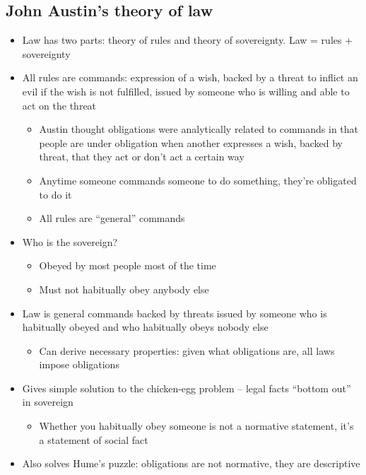 \hypertarget{john-austins-theory-of-law}{%
\subsection{John Austin's theory of
law}\label{john-austins-theory-of-law}}

\begin{itemize}
\tightlist
\item
  Law has two parts: theory of rules and theory of sovereignty. Law =
  rules + sovereignty
\item
  All rules are commands: expression of a wish, backed by a threat to
  inflict an evil if the wish is not fulfilled, issued by someone who is
  willing and able to act on the threat

  \begin{itemize}
  \tightlist
  \item
    Austin thought obligations were analytically related to commands in
    that people are under obligation when another expresses a wish,
    backed by threat, that they act or don't act a certain way
  \item
    Anytime someone commands someone to do something, they're obligated
    to do it
  \item
    All rules are ``general'' commands
  \end{itemize}
\item
  Who is the sovereign?

  \begin{itemize}
  \tightlist
  \item
    Obeyed by most people most of the time
  \item
    Must not habitually obey anybody else
  \end{itemize}
\item
  Law is general commands backed by threats issued by someone who is
  habitually obeyed and who habitually obeys nobody else

  \begin{itemize}
  \tightlist
  \item
    Can derive necessary properties: given what obligations are, all
    laws impose obligations
  \end{itemize}
\item
  Gives simple solution to the chicken-egg problem -- legal facts
  ``bottom out'' in sovereign

  \begin{itemize}
  \tightlist
  \item
    Whether you habitually obey someone is not a normative statement,
    it's a statement of social fact
  \end{itemize}
\item
  Also solves Hume's puzzle: obligations are not normative, they are
  descriptive


\end{itemize}
